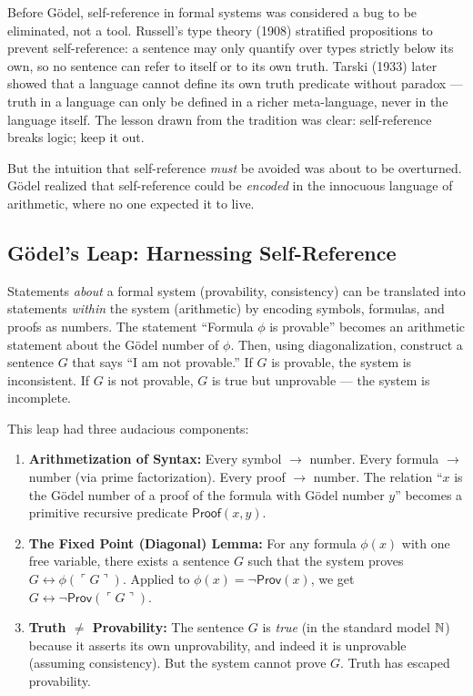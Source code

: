 Before Gödel, self-reference in formal systems was considered a bug to be eliminated, not a tool. Russell's type theory (1908) stratified propositions to prevent self-reference: a sentence may only quantify over types strictly below its own, so no sentence can refer to itself or to its own truth. Tarski (1933) later showed that a language cannot define its own truth predicate without paradox --- truth in a language can only be defined in a richer meta-language, never in the language itself. The lesson drawn from the tradition was clear: self-reference breaks logic; keep it out.

But the intuition that self-reference \emph{must} be avoided was about to be overturned. Gödel realized that self-reference could be \emph{encoded} in the innocuous language of arithmetic, where no one expected it to live.

\subsection{Gödel's Leap: Harnessing Self-Reference}
\label{sec:godel:leap}

Statements \emph{about} a formal system (provability, consistency) can be translated into statements \emph{within} the system (arithmetic) by encoding symbols, formulas, and proofs as numbers. The statement ``Formula $\phi$ is provable'' becomes an arithmetic statement about the Gödel number of $\phi$. Then, using diagonalization, construct a sentence $G$ that says ``I am not provable.'' If $G$ is provable, the system is inconsistent. If $G$ is not provable, $G$ is true but unprovable --- the system is incomplete.

This leap had three audacious components:

\begin{enumerate}
\item \textbf{Arithmetization of Syntax:} Every symbol $\to$ number. Every formula $\to$ number (via prime factorization). Every proof $\to$ number. The relation ``$x$ is the Gödel number of a proof of the formula with Gödel number $y$'' becomes a primitive recursive predicate $\mathsf{Proof}(x, y)$.

\item \textbf{The Fixed Point (Diagonal) Lemma:} For any formula $\phi(x)$ with one free variable, there exists a sentence $G$ such that the system proves $G \leftrightarrow \phi(\ulcorner G \urcorner)$. Applied to $\phi(x) = \neg \mathsf{Prov}(x)$, we get $G \leftrightarrow \neg \mathsf{Prov}(\ulcorner G \urcorner)$.

\item \textbf{Truth $\neq$ Provability:} The sentence $G$ is \emph{true} (in the standard model $\mathbb{N}$) because it asserts its own unprovability, and indeed it is unprovable (assuming consistency). But the system cannot prove $G$. Truth has escaped provability.
\end{enumerate}

